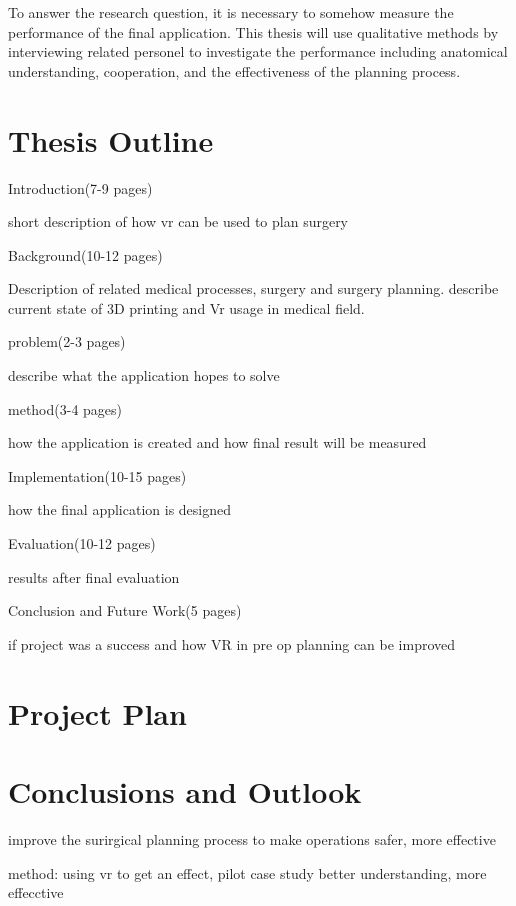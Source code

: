 \documentclass[11pt]{article}
\begin{document}
    To answer the research question, it is necessary to somehow measure the performance of the final application. This thesis will use qualitative methods by interviewing related personel to investigate the performance including anatomical understanding, cooperation, and the effectiveness of the planning process. 

\section{Thesis Outline}
Introduction(7-9 pages)

short description of how vr can be used to plan surgery

Background(10-12 pages)

Description of related medical processes, surgery and surgery planning.
describe current state of 3D printing and Vr usage in medical field.

problem(2-3 pages)

describe what the application hopes to solve

method(3-4 pages)

how the application is created and how final result will be measured

Implementation(10-15 pages) 

how the final application is designed

Evaluation(10-12 pages)

results after final evaluation

Conclusion and Future Work(5 pages)

if project was a success and how VR in pre op planning can be improved

\section{Project Plan}



\section{Conclusions and Outlook}







improve the surirgical planning process to make operations safer, more effective

method: using vr to get an effect, pilot case study
better understanding, more effecctive
\end{document}
